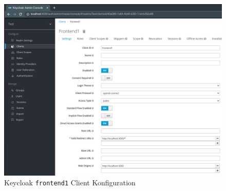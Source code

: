 \begin{figure}[!ht]
	\centering
	\includegraphics[width=1\textwidth]{Images/EbertScherer/KeycloakClientConfig.PNG}
	\caption{Keycloak \texttt{frontend1} Client Konfiguration}
	\label{fig:EB_Keycloak frontend1 Client Konfiguration}
\end{figure}

